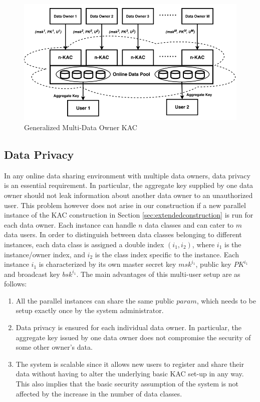 \begin{figure}
\centering
\captionsetup{font=scriptsize}
\includegraphics[scale=0.4]{Figs/MultiUser.png}
\caption{Generalized Multi-Data Owner KAC}
\label{fig:two-tier}
\end{figure}

\subsection{Data Privacy}
\label{subsec:multiownerKAC}

In any online data sharing environment with multiple data owners, data privacy is an essential requirement. In particular, the aggregate key supplied by one data owner should not leak information about another data owner to an unauthorized user. This problem however does not arise in our construction if a new parallel instance of the KAC construction in Section \ref{sec:extendedconstruction}  is run for each data owner. Each instance can handle $n$ data classes and can cater to $m$ data users. In order to distinguish between data classes belonging to different instances, each data class is assigned a double index $(i_1,i_2)$, where $i_1$ is the instance/owner index, and $i_2$ is the class index specific to the instance. Each instance $i_1$ is characterized by its own master secret key $msk^{i_1}$, public key $PK^{i_1}$ and broadcast key $bsk^{i_1}$. The main advantages of this multi-user setup are as follows:

\begin{enumerate}
 \item All the parallel instances can share the same public $param$, which needs to be setup exactly once by the system administrator.
 \item Data privacy is ensured for each individual data owner. In particular, the aggregate key issued by one data owner does not compromise the security of some other owner's data.
 \item The system is scalable since it allows new users to register and share their data without having to alter the underlying basic KAC set-up in any way. This also implies that the basic security assumption of the system is not affected by the increase in the number of data classes.
\end{enumerate}

